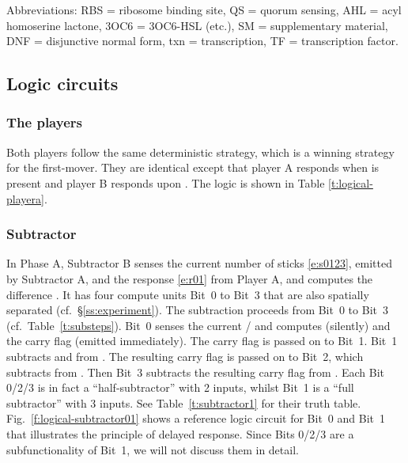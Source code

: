 \documentclass[12pt,notitlepage]{article}
\newcommand{\ra}[1]{{\color{Blue}#1}}
\begin{document}
%
%

Abbreviations:
RBS = ribosome binding site,
QS = quorum sensing,
AHL = acyl homoserine lactone,
{3OC6} = {3OC6}{-}HSL (etc.),
SM = supplementary material,
DNF = disjunctive normal form,
txn = transcription,
TF = transcription factor.  %


\subsection{Logic circuits}


\subsubsection*{The players} \label{ss:players}

Both players
follow the same deterministic strategy,
which is a winning strategy for the first-mover.
%
They are identical except
that player A responds when  is present
and player B responds upon .
%
The logic is shown in Table \ref{t:logical-playera}.


\subsubsection*{Subtractor} \label{ss:sub}


In Phase A,
Subtractor B 
senses the current number of sticks \eqref{e:s0123},
emitted by Subtractor A,
and 
the response \eqref{e:r01} from Player A,
and
computes the difference .
%
It has four compute units Bit~0 to Bit~3
that are also
spatially separated (cf.~\S\ref{ss:experiment}). 
%
The subtraction proceeds from Bit~0 to Bit~3
(cf.~Table~\ref{t:substeps}).
%
Bit~0 senses the current /
and computes  (silently)
and the carry flag  (emitted immediately).
%
The carry flag is passed on to Bit~1.
%
Bit~1 subtracts  and  from . 
%
The resulting carry flag  
is passed on to Bit~2, 
which subtracts  from .
%
Then Bit~3 subtracts the resulting carry flag
 from .
%
Each Bit 0/2/3
is in fact a ``half-subtractor'' with 2 inputs,
whilst
Bit~1 is a ``full subtractor'' with 3 inputs.
%
%
%
See
Table~\ref{t:subtractor1}
for their truth table.
%
Fig.~\ref{f:logical-subtractor01}
shows a reference logic circuit 
for Bit~0 and Bit~1
that illustrates the principle of delayed response.
%
%
%
\ra{
Since
Bits 0/2/3 
are a subfunctionality of Bit~1,
we will not discuss them in detail.
}
\end{document}
